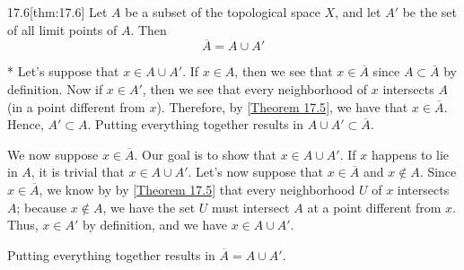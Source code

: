 \begin{thmBox}{17.6}[thm:17.6]
    Let \( A \) be a subset of the topological space \( X \), and let 
    \( A' \) be the set of all limit points of \( A \).
    Then 
    \begin{equation*}
        \overline{ A }
        =
        A \cup A'
    \end{equation*}

    \baseRule

    \begin{proofBox}*
        Let's suppose that \( x \in A \cup A' \).
        If \( x \in A \), then we see that \( x \in \overline{ A } \) since 
        \( A \subset \overline{ A } \) by definition.
        Now if \( x \in A' \), then we see that every neighborhood of \( x \)
        intersects \( A \) (in a point different from \( x \)).
        Therefore, by [\hyperlink{thm:17.5}{Theorem 17.5}], we have that 
        \( x \in \overline{ A } \).
        Hence, \( A' \subset A \).
        Putting everything together results in 
        \( A \cup A' \subset \overline{ A } \).

        \baseSkip

        We now suppose \( x \in \overline{ A } \).
        Our goal is to show that \( x \in A \cup A' \).
        If \( x \) happens to lie in \( A \), it is trivial that
        \( x \in A \cup A' \).
        Let's now suppose that \( x \in \overline{ A } \) and \( x \notin A \).
        Since \( x \in \overline{ A } \), we know by by [\hyperlink{thm:17.5}
        {Theorem 17.5}] that every neighborhood \( U \) of \( x \) intersects 
        \( A \);
        because \( x \notin A \), we have the set \( U \) must intersect \( A \)
        at a point different from \( x \).
        Thus, \( x \in A' \) by definition, and we have 
        \( x \in A \cup A' \).

        \baseSkip

        Putting everything together results in \( \overline{ A } = A \cup A' \).
    \end{proofBox}
\end{thmBox}

